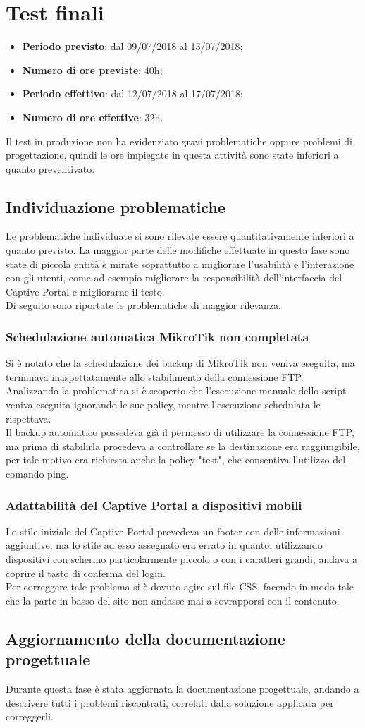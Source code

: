 \documentclass[Realizzazione.tex]{subfiles}
\begin{document}
\section{Test finali	}
\begin{itemize}
	\item \textbf{Periodo previsto}: dal 09/07/2018 al 13/07/2018;
	\item \textbf{Numero di ore previste}: 40h;
	\item \textbf{Periodo effettivo}: dal 12/07/2018 al 17/07/2018;
	\item \textbf{Numero di ore effettive}: 32h.
\end{itemize}
Il test in produzione non ha evidenziato gravi problematiche oppure problemi di progettazione, quindi le ore impiegate in questa attività sono state inferiori a quanto preventivato.

\subsection{Individuazione problematiche}
Le problematiche individuate si sono rilevate essere quantitativamente inferiori a quanto previsto. La maggior parte delle modifiche effettuate in questa fase sono state di piccola entità e mirate soprattutto a migliorare l'usabilità e l'interazione con gli utenti, come ad esempio migliorare la responsibilità dell'interfaccia del Captive Portal e migliorarne il testo.\\
Di seguito sono riportate le problematiche di maggior rilevanza.

\subsubsection{Schedulazione automatica MikroTik non completata}
Si è notato che la schedulazione dei backup di MikroTik non veniva eseguita, ma terminava inaspettatamente allo stabilimento della connessione FTP. \\
Analizzando la problematica si è scoperto che l'esecuzione manuale dello script veniva eseguita ignorando le sue policy, mentre l'esecuzione schedulata le rispettava.\\
Il backup automatico possedeva già il permesso di utilizzare la connessione FTP, ma prima di stabilirla procedeva a controllare se la destinazione era raggiungibile, per tale motivo era richiesta anche la policy "test", che consentiva l'utilizzo del comando ping.

\subsubsection{Adattabilità del Captive Portal a dispositivi mobili}
Lo stile iniziale del Captive Portal prevedeva un footer con delle informazioni aggiuntive, ma lo stile ad esso assegnato era errato in quanto, utilizzando dispositivi con schermo particolarmente piccolo o con i caratteri grandi, andava a coprire il tasto di conferma del login. \\
Per correggere tale problema si è dovuto agire sul file CSS, facendo in modo tale che la parte in basso del sito non andasse mai a sovrapporsi con il contenuto.

\subsection{Aggiornamento della documentazione progettuale}
Durante questa fase è stata aggiornata la documentazione progettuale, andando a descrivere tutti i problemi riscontrati, correlati dalla soluzione applicata per correggerli.
\end{document}
